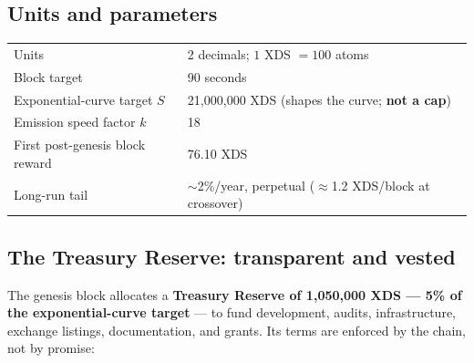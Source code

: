 \documentclass[11pt,a4paper]{article}
\begin{document}
\subsection{Units and parameters}

\begin{center}
\small
\begin{tabularx}{\textwidth}{@{}lX@{}}
\toprule
Units & 2 decimals; $1$ XDS $= 100$ atoms \\
Block target & 90 seconds \\
Exponential-curve target $S$ & 21{,}000{,}000 XDS (shapes the curve; \textbf{not a cap}) \\
Emission speed factor $k$ & 18 \\
First post-genesis block reward & 76.10 XDS \\
Long-run tail & $\sim$2\%/year, perpetual ($\approx$1.2 XDS/block at crossover) \\
\bottomrule
\end{tabularx}
\end{center}

\subsection{The Treasury Reserve: transparent and vested}\label{sec:treasury}

The genesis block allocates a \textbf{Treasury Reserve of 1{,}050{,}000 XDS
--- 5\% of the exponential-curve target} --- to fund development, audits,
infrastructure, exchange listings, documentation, and grants. Its terms are
enforced by the chain, not by promise:
\end{document}
